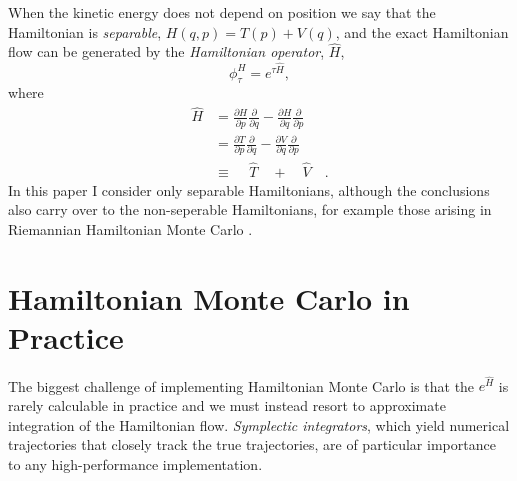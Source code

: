 \documentclass{article}
\begin{document}
When the kinetic energy does not depend on position we say that
the Hamiltonian is \textit{separable}, $H (q, p) = T (p) + V (q)$,  and
the exact Hamiltonian flow can be generated by the \textit{Hamiltonian operator}, 
$\hat{H}$,
%
\begin{equation*}
\phi^{H}_{\tau} = e^{\tau \hat{H}},
\end{equation*}
%
where
%
\begin{align*}
\hat{H} 
&= 
\frac{ \partial H }{ \partial p } \frac{ \partial }{ \partial q}
- \frac{ \partial H }{ \partial q } \frac{ \partial }{ \partial p}
\\
&= 
\frac{ \partial T }{ \partial p } \frac{ \partial }{ \partial q}
- \frac{ \partial V }{ \partial q } \frac{ \partial }{ \partial p}
\\
&\equiv
\quad\, \hat{T} \quad + \quad \hat{V} \quad.
\end{align*}
%
In this paper I consider only separable Hamiltonians, although
the conclusions also carry over to the non-seperable Hamiltonians,
for example those arising in
Riemannian Hamiltonian Monte Carlo \cite{GirolamiEtAl:2011}.

\section{Hamiltonian Monte Carlo in Practice}

The biggest challenge of implementing Hamiltonian Monte Carlo is that the
$e^{\hat{H}}$ is rarely calculable in practice and we must instead resort 
to approximate integration of the Hamiltonian flow.  \textit{Symplectic integrators}, 
which yield numerical trajectories that closely track the true trajectories, are  
of particular importance to any high-performance implementation. 
\end{document}
